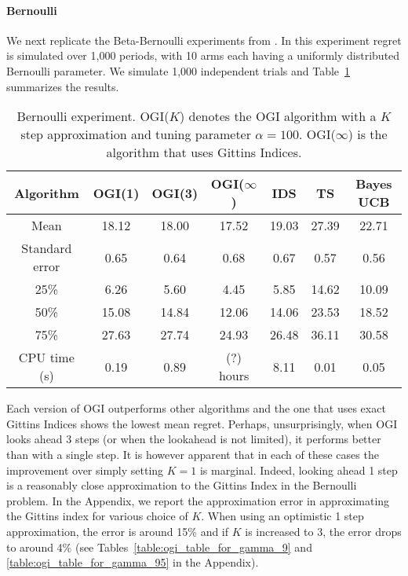 \paragraph{Bernoulli}
We next replicate the Beta-Bernoulli experiments from \cite{russo2014learning}.
In this experiment regret is simulated over 1,000 periods, with 10 arms each having a uniformly distributed Bernoulli parameter. We simulate 1,000 independent trials and Table~\ref{table:bernoulli_experiment1} summarizes the results.

\begin{table}[h!]
	\centering
	\begin{tabular}{ccccccc} \toprule
		\textbf{Algorithm} & \textbf{OGI(1)} & \textbf{OGI(3)} &  \textbf{OGI($\infty$)} & \textbf{IDS} & \textbf{TS} & \textbf{Bayes UCB}  \\ \midrule
		Mean &  18.12 & 18.00 & 17.52 & 19.03 & 27.39 & 22.71 \\ 
		Standard error & 0.65 & 0.64 &  0.68 & 0.67 & 0.57 & 0.56 \\ 
		25\% & 6.26 & 5.60 & 4.45 & 5.85 & 14.62 & 10.09 \\
		50\% & 15.08 & 14.84 &12.06 & 14.06 & 23.53 & 18.52 \\
		75\% & 27.63 & 27.74 & 24.93 & 26.48 & 36.11 & 30.58 \\
		CPU time (s) & 0.19 & 0.89 & (?) hours & 8.11 & 0.01 & 0.05  \\ \bottomrule
	\end{tabular}
	\caption[Table caption text]{Bernoulli experiment. OGI($K$) denotes the OGI algorithm with a $K$ step approximation and tuning parameter $\alpha = 100$. OGI($\infty$) is the algorithm that uses Gittins Indices.}
	\label{table:bernoulli_experiment1}
\end{table}
Each version of OGI outperforms other algorithms and the one that uses exact Gittins Indices shows the lowest mean regret.
Perhaps, unsurprisingly, when OGI  looks ahead 3 steps (or when the lookahead is not limited), it performs better than with a single step. It is however apparent that in each of these cases the improvement over simply setting $K=1$ is marginal. Indeed, looking ahead 1 step is a reasonably close approximation to the Gittins Index in the Bernoulli problem. In the Appendix, we report the approximation error in approximating the Gittins index for various choice of $K$. When using an optimistic 1 step approximation, the error is around 15\% and if $K$ is increased to 3, the error drops to around 4\% (see Tables~\ref{table:ogi_table_for_gamma_9} and \ref{table:ogi_table_for_gamma_95} in the Appendix). 

